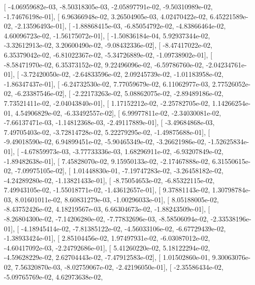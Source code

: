 \documentclass{article}
\begin{document}
       [ -4.06959682e-03,  -8.50318305e-03,  -2.05897791e-02,
         -9.50310989e-02,  -1.74676198e-01],
       [  6.96366948e-02,   3.26504905e-03,   4.02470422e-02,
          6.45221589e-02,  -2.13596493e-01],
       [ -1.88868415e-03,  -6.85054792e-02,  -4.83866464e-02,
          4.60096723e-02,  -1.56175072e-01],
       [ -1.50836184e-04,   5.92937344e-02,  -3.32612913e-02,
          3.20600490e-02,  -9.08432336e-02],
       [ -8.47417022e-02,   6.35379042e-02,  -6.81022367e-02,
         -5.34726889e-02,  -1.09738902e-01],
       [ -8.58471970e-02,   6.35373152e-02,   9.22496096e-02,
         -6.59786760e-02,  -2.04234761e-01],
       [ -3.72420050e-02,  -2.64833596e-02,   2.09245739e-02,
         -1.01183958e-02,  -1.86347437e-01],
       [ -6.24732530e-02,   7.77059679e-02,   6.11062977e-03,
          2.77526052e-02,  -6.23387546e-02],
       [ -2.22173263e-02,   5.08862075e-02,  -2.89489186e-02,
          7.73521411e-02,  -2.04043840e-01],
       [  1.17152212e-02,  -2.25782705e-02,   1.14266254e-01,
          4.54906829e-02,  -6.33492557e-02],
       [  6.99977811e-02,  -2.34030081e-02,  -7.66137471e-03,
         -1.14812368e-03,  -2.49117889e-01],
       [ -3.49684868e-03,   7.49705403e-02,  -3.72814728e-02,
          5.22279295e-02,  -1.49875688e-01],
       [ -9.49018590e-02,   6.94899451e-02,  -5.90465349e-02,
         -3.26621986e-02,  -1.52625834e-01],
       [ -4.67859973e-03,  -3.77733336e-03,   1.68296911e-02,
         -6.93207849e-02,  -1.89482638e-01],
       [  7.45828070e-02,   9.15950133e-02,  -2.17467888e-02,
          6.31550615e-02,  -7.09975105e-02],
       [  1.01448830e-01,  -7.19747283e-02,  -3.26458182e-02,
         -4.24289280e-02,  -1.13821433e-01],
       [ -8.75054653e-02,  -6.85322115e-02,   7.49943105e-02,
         -1.55018771e-02,  -1.43612657e-01],
       [  9.37881143e-02,   1.30798784e-03,   8.01601011e-02,
          8.60831279e-03,  -1.00296033e-01],
       [  8.05188005e-02,  -8.43752426e-02,   4.18219567e-03,
          6.66304673e-02,  -1.88243509e-01],
       [ -8.26804300e-02,  -7.14206280e-02,  -7.77832696e-03,
         -8.58506094e-02,  -2.33538196e-01],
       [ -4.18945414e-02,  -7.81385122e-02,  -4.56033106e-02,
         -6.67729439e-02,  -1.38933424e-01],
       [  2.85104456e-02,   1.97497931e-02,  -6.03087012e-02,
         -4.60417092e-03,  -2.24792686e-01],
       [  5.41260220e-02,   5.18122294e-02,  -4.59628229e-02,
          2.62704443e-02,  -7.47912583e-02],
       [  1.01502860e-01,   9.30063076e-02,   7.56320870e-03,
         -8.02759067e-02,  -2.42196050e-01],
       [ -2.35586434e-02,  -5.09765769e-02,   4.62973638e-02,
\end{document}
